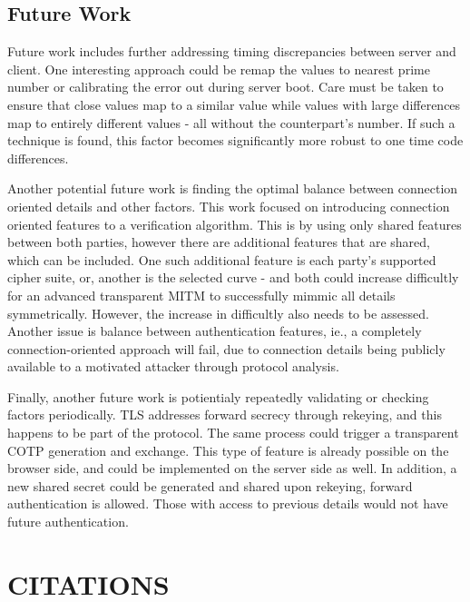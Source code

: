 \documentclass[a4paper, 11pt]{article} 				%
\begin{document}
\subsection{Future Work}
Future work includes further addressing timing discrepancies between server and client. One interesting approach could be remap the values to nearest prime number or calibrating the error out during server boot. Care must be taken to ensure that close values map to a similar value while values with large differences map to entirely different values - all without the counterpart's number. If such a technique is found, this factor becomes significantly more robust to one time code differences.

Another potential future work is finding the optimal balance between connection oriented details and other factors. This work focused on introducing connection oriented features to a verification algorithm. This is by using only shared features between both parties, however there are additional features that are shared, which can be included. One such additional feature is each party's supported cipher suite, or, another is the selected curve - and both could increase difficultly for an advanced transparent MITM to successfully mimmic all details symmetrically. However, the increase in difficultly also needs to be assessed. Another issue is balance between authentication features, ie., a completely connection-oriented approach will fail, due to connection details being publicly available to a motivated attacker through protocol analysis.

Finally, another future work is potientialy repeatedly validating or checking factors periodically. TLS addresses forward secrecy through rekeying, and this happens to be part of the protocol. The same process could trigger a transparent COTP generation and exchange. This type of feature is already possible on the browser side, and could be implemented on the server side as well. In addition, a new shared secret could be generated and shared upon rekeying, forward authentication is allowed. Those with access to previous details would not have future authentication. 



\section{CITATIONS } 	%
\end{document}
